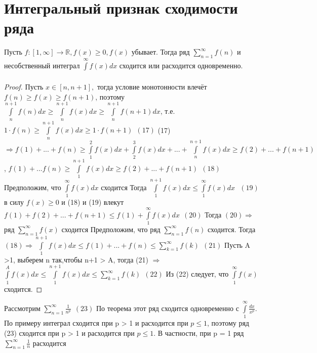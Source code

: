 \section{Интегральный признак сходимости ряда}
\begin{theorem}
	Пусть $f:[1,\infty]\to \mathbb{R}, f(x) \geq 0, f(x)$ убывает. Тогда ряд $\sum_{n = 1}^{\infty}{f(n)}$ и несобственный интеграл $\int\limits_{}^{\infty}{f(x)}dx$ сходится или расходится одновременно.
\end{theorem}
\begin{proof}
	Пусть $x \in [n,n+1],$ тогда условие монотонности влечёт $f(n) \geq f(x) \geq f(n+1)$, поэтому $\int\limits_{n}^{n+1}{f(n)}dx \geq \int\limits_{n}^{n+1}{f(x)}dx \geq \int\limits_{n}^{n+1}{f(n+1)}dx$, т.е. $1 \cdot f(n) \geq \int\limits_{n}^{n+1}{f(x)}dx \geq 1 \cdot f(n+1) \ \ (17)$
	(17) $\Rightarrow f(1) + ... + f(n) \geq \int\limits_{1}^{2}{f(x)}dx + \int\limits_{2}^{3}{f(x)}dx +...+ \int\limits_{n}^{n+1}{f(x)}dx \geq f(2) + ... + f(n+1)$,
	$f(1) + ... f(n) \geq \int\limits_{1}^{n+1}{f(x)}dx \geq f(2) + ... + f(n+1) \ \ (18) $
	Предположим, что $\int\limits_{1}^{\infty}{f(x)}dx$ сходится Тогда $\int\limits_{1}^{n+1}{f(x)}dx \leq \int\limits_{1}^{\infty}{f(x)}dx \ \ \ (19)$ в силу $f(x) \geq 0$ и (18) и (19) влекут $f(1)+f(2)+...+f(n+1) \leq f(1) + \int\limits_{1}^{\infty}{f(x)}dx \ \ (20)$
	Тогда $(20)  \Rightarrow$ ряд $\sum_{n=1}^{\infty}{f(x)}$ сходится Предположим, что ряд $\sum_{n=1}^{\infty}{f(n)}$ сходится. Тогда $(18) \Rightarrow \int\limits_{1}^{n+1}{f(x)}dx \leq f(1)+...+f(n) \leq \sum_{k=1}^{\infty}{f(k)} \ \ (21)$ Пусть A >1, выберем n так,чтобы n+1 > A, тогда (21) $\Rightarrow$ $\int\limits_{1}^{A}{f(x)}dx \leq \int\limits_{1}^{n+1}{f(x)}dx \leq \sum_{k=1}^{\infty}{f(k)} \ \  (22)$ Из (22) следует, что $\int\limits_1^{\infty}{f(x)}$ сходится.
\end{proof}
\begin{example}
	Рассмотрим $\sum_{n=1}^{\infty}{\frac{1}{n^p}}\ \ (23)$ По теорема этот ряд сходится одновременно с $\int\limits_{1}^{\infty}{\frac{dx}{x^p}}$. По примеру интеграл сходится при p > 1 и расходится при $p \leq 1$, поэтому ряд (23) сходится при p > 1 и расходится при $p \leq 1$. В частности, при p = 1 ряд $\sum_{n=1}^{\infty}{\frac{1}{n}}$ расходится
\end{example}
